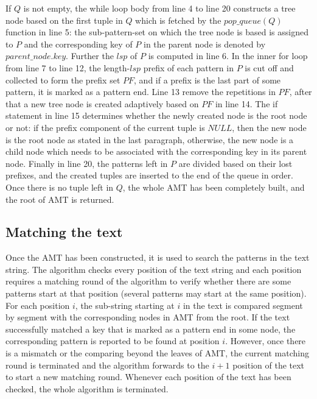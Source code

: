 \documentclass[legalpaper]{article}
\begin{document}
If $Q$ is not empty, the \textsf{while} loop body from line 4 to line
20 constructs a tree node based on the first tuple in $Q$ which is
fetched by the $pop\_queue(Q)$ function in line 5: the sub-pattern-set
on which the tree node is based is assigned to $P$ and the
corresponding key of $P$ in the parent node is denoted by
$parent\_node.key$.  Further the $lsp$ of $P$ is computed in line
6. In the inner \textsf{for} loop from line 7 to line 12, the
length-$lsp$ prefix of each pattern in $P$ is cut off and collected to
form the prefix set $PF$, and if a prefix is the last part of some
pattern, it is marked as a pattern end. Line 13 remove the repetitions
in $PF$, after that a new tree node is created adaptively based on
$PF$ in line 14. The \textsf{if} statement in line 15 determines
whether the newly created node is the root node or not: if the prefix
component of the current tuple is $NULL$, then the new node is the
root node as stated in the last paragraph, otherwise, the new node is
a child node which needs to be associated with the corresponding key
in its parent node. Finally in line 20, the patterns left in $P$ are
divided based on their lost prefixes, and the created tuples are
inserted to the end of the queue in order. Once there is no tuple left
in $Q$, the whole \textsf{AMT} has been completely built, and the root
of \textsf{AMT} is returned.

\subsection{Matching the text}
\label{sec:mp}
 
Once the \textsf{AMT} has been constructed, it is used to search the
patterns in the text string. The algorithm checks every position of
the text string and each position requires a \textsf{matching round}
of the algorithm to verify whether there are some patterns start at
that position (several patterns may start at the same position). For
each position $i$, the sub-string starting at $i$ in the text is
compared segment by segment with the corresponding nodes in
\textsf{AMT} from the root. If the text successfully matched a key
that is marked as a pattern end in some node, the corresponding
pattern is reported to be found at position $i$. However, once there
is a mismatch or the comparing beyond the leaves of \textsf{AMT}, the
current matching round is terminated and the algorithm forwards to the
$i+1$ position of the text to start a new matching round. Whenever
each position of the text has been checked, the whole algorithm is
terminated.
\end{document}
